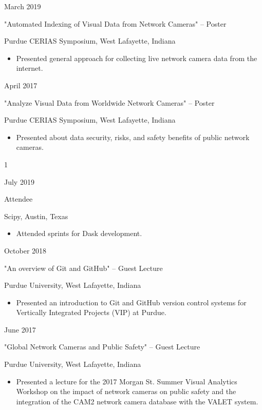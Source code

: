 \documentclass[10pt]{article}
\newlength{\cvcolumngapwidth}
\newlength{\cvleftcolumnwidth}
\newlength{\cvrightcolumnwidth}
\newcommand{\cvtitlestyle}[1]{{\large\cvtitlefont\textcolor{cvtitlecolor}{#1}}}
\newcommand{\cvdurationstyle}[1]{{\small\cvdurationfont\textcolor{cvdurationcolor}{#1}}}
\newlength{\cvafteritemskipamount}
\newlength{\cvparskip}
\newcommand{\cvitem}[2]{
    \begin{minipage}[t]{\cvleftcolumnwidth}
        \raggedleft #1
    \end{minipage}%
    \hspace{\cvcolumngapwidth}%
    \begin{minipage}[t]{\cvrightcolumnwidth}
        \setlength{\parskip}{\cvparskip} #2
    \end{minipage}

    \vspace{\cvafteritemskipamount}
}
\newcommand{\cvtitle}[1]{
    \cvtitlestyle{#1}

    \vspace{1mm plus 0.25mm minus 0.25mm}
    \vspace{-\cvparskip}
}
\def\cv{0}
\begin{document}
\cvitem{
    \cvdurationstyle{March 2019}
}{
    \cvtitle{"Automated Indexing of Visual Data from Network Cameras" – Poster}
    
    Purdue CERIAS Symposium, West Lafayette, Indiana

    \begin{itemize}[leftmargin=*]
        \item Presented general approach for collecting live network camera data from the internet.
    \end{itemize}
}

\cvitem{
    \cvdurationstyle{April 2017}
}{
    \cvtitle{"Analyze Visual Data from Worldwide Network Cameras" – Poster}
    
    Purdue CERIAS Symposium, West Lafayette, Indiana

    \begin{itemize}[leftmargin=*]
        \item Presented about data security, risks, and safety benefits of public network cameras.
    \end{itemize}
}

\if\cv1
\cvitem{
    \cvdurationstyle{July 2019}
}{
    \cvtitle{Attendee}
    
    Scipy, Austin, Texas

    \begin{itemize}[leftmargin=*]
        \item Attended sprints for Dask development.
    \end{itemize}
}
\fi

\cvitem{
    \cvdurationstyle{October 2018}
}{
    \cvtitle{"An overview of Git and GitHub" – Guest Lecture}
    
    Purdue University, West Lafayette, Indiana

    \begin{itemize}[leftmargin=*]
        \item Presented an introduction to Git and GitHub version control systems for Vertically Integrated Projects (VIP) at Purdue.
    \end{itemize}
}

\cvitem{
    \cvdurationstyle{June 2017}
}{
    \cvtitle{"Global Network Cameras and Public Safety" – Guest Lecture}
    
    Purdue University, West Lafayette, Indiana

    \begin{itemize}[leftmargin=*]
        \item Presented a lecture for the 2017 Morgan St. Summer Visual Analytics Workshop on the impact of network cameras on public safety and the integration of the CAM2 network camera database with the VALET system.
    \end{itemize}
}
\end{document}
